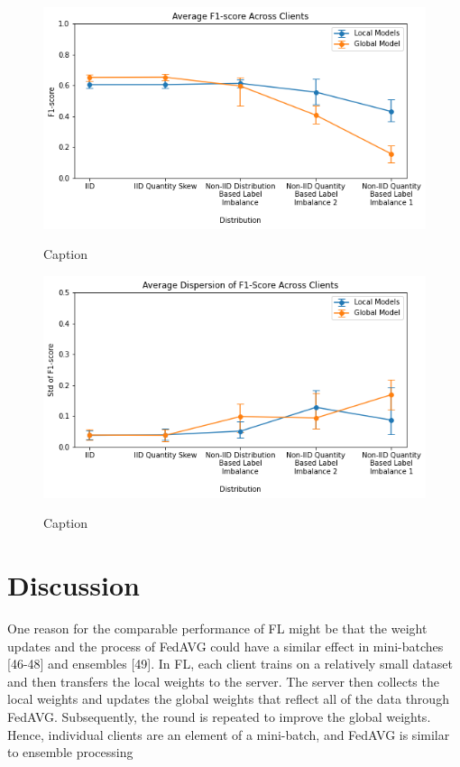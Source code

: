 \documentclass[letterpaper]{article} %
\begin{document}
\begin{figure}[h]
{\includegraphics[width=\columnwidth]{Avg_f1_score_of_local_models_against_that_of_global_model}}
\caption{Caption}
\end{figure}

\begin{figure}[h]
{\includegraphics[width=\columnwidth]{Avg_dispersion_of_f1_score_of_local_models_against_that_of_global_model}}
\caption{Caption}
\end{figure}

\bigskip
\section{Discussion}

One reason for the comparable performance of FL might be that
the weight updates and the process of FedAVG could have a similar effect in mini-batches [46-48] and ensembles [49]. In FL, each client trains on a relatively small dataset and then
transfers the local weights to the server. The server then collects
the local weights and updates the global weights that reflect all
of the data through FedAVG. Subsequently, the round is
repeated to improve the global weights. Hence, individual clients
are an element of a mini-batch, and FedAVG is similar to
ensemble processing
\end{document}
